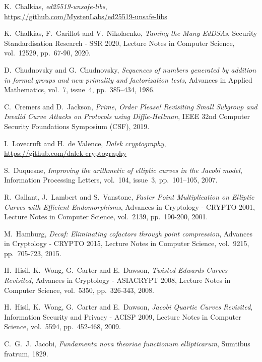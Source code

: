 \documentclass{llncs}
\begin{document}
\begin{thebibliography}{20}
K.~Chalkias,
\emph{ed25519-unsafe-libs},\\
\url{https://github.com/MystenLabs/ed25519-unsafe-libs}

K.~Chalkias, F.~Garillot and V.~Nikolaenko,
\emph{Taming the Many EdDSAs},
Security Standardisation Research - SSR 2020, Lecture Notes in
Computer Science, vol.~12529, pp.~67-90, 2020.

D.~Chudnovsky and G.~Chudnovsky,
\emph{Sequences of numbers generated by addition
in formal groups and new primality and factorization tests},
Advances in Applied Mathematics, vol.~7, issue~4, pp.~385–434, 1986.

C.~Cremers and D.~Jackson,
\emph{Prime, Order Please! Revisiting Small Subgroup and Invalid Curve
Attacks on Protocols using Diffie-Hellman},
IEEE 32nd Computer Security Foundations Symposium (CSF), 2019.

I.~Lovecruft and H.~de Valence,
\emph{Dalek cryptography},\\
\url{https://github.com/dalek-cryptography}

S.~Duquesne,
\emph{Improving the arithmetic of elliptic curves in the Jacobi model},
Information Processing Letters, vol.~104, issue~3, pp.~101–105, 2007.

R.~Gallant, J.~Lambert and S.~Vanstone,
\emph{Faster Point Multiplication on Elliptic Curves with Efficient
Endomorphisms},
Advances in Cryptology - CRYPTO 2001, Lecture Notes in Computer Science,
vol.~2139, pp.~190-200, 2001.

M.~Hamburg,
\emph{Decaf: Eliminating cofactors through point compression},
Advances in Cryptology - CRYPTO 2015, Lecture Notes in Computer Science,
vol.~9215, pp.~705-723, 2015.

H.~Hisil, K.~Wong, G.~Carter and E.~Dawson,
\emph{Twisted Edwards Curves Revisited},
Advances in Cryptology - ASIACRYPT 2008, Lecture Notes in Computer Science,
vol.~5350, pp.~326-343, 2008.

H.~Hisil, K.~Wong, G.~Carter and E.~Dawson,
\emph{Jacobi Quartic Curves Revisited},
Information Security and Privacy - ACISP 2009, Lecture Notes in Computer
Science, vol.~5594, pp.~452-468, 2009.

C.~G.~J.~Jacobi,
\emph{Fundamenta nova theoriae functionum ellipticarum},
Sumtibus fratrum, 1829.


\end{thebibliography}
\end{document}
